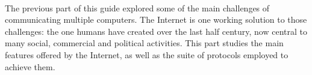 \ \\[-10cm]
The previous part of this guide explored some of the main challenges of communicating multiple computers.
The Internet is one working solution to those challenges: the one humans have created over the last half century,
now central to many social, commercial and political activities.
%
This part studies the main features offered by the Internet, as well as the suite of protocols
employed to achieve them.
